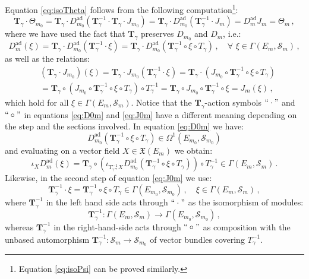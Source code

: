 \documentclass[10pt, cmp, numbook, final, a4paper]{svjour}
\newcommand*{\SavedEqref}{}
\let\SavedEqref\eqref
\renewcommand*{\eqref}[1]{%
  \begingroup
    \hypersetup{
      linkcolor=blue,
      linkbordercolor=blue,
    }%
    \SavedEqref{#1}%
  \endgroup
}
\def\ad{\mathrm{ad}}
\def\ad{\mathrm{ad}}
\def\cS{\mathcal{S}}
\def\mT{\mathbf{T}}
\begin{document}
\begin{remark}
\label{remark:Tgammaction}
Equation \eqref{eq:isoTheta} follows from the following
computation\footnote{Equation \eqref{eq:isoPsi} can be proved
  similarly.}:
\begin{equation*}
\mT_{\gamma} \cdot \Theta_{m_{0}} = \mT_{\gamma}\cdot D^{\ad}_{m_{0}}(\mT^{-1}_{\gamma}\cdot\mT_{\gamma}\cdot J_{m_{0}}) = \mT_{\gamma}\cdot D^{\ad}_{m_{0}}(\mT^{-1}_{\gamma}\cdot J_{m}) = D^{\ad}_{m} J_{m} = \Theta_{m}\, ,
\end{equation*}
where we have used the fact that $\mT_{\gamma}$ preserves $D_{m_{0}}$ and $D_{m}$, i.e.:
\begin{equation}
\label{eq:D0m}
D^{\ad}_{m}(\xi)  =  \mT_{\gamma}\cdot D^{\ad}_{m_{0}} (\mT^{-1}_{\gamma}\cdot\xi) = \mT_{\gamma}\cdot D^{\ad}_{m_{0}} (\mT^{-1}_{\gamma}\circ\xi \circ T_{\gamma})\, , \quad\forall\,\, \xi\in\Gamma(E_{m},\cS_{m})\, ,
\end{equation}
as well as the relations:
\begin{eqnarray}
\label{eq:J0m}
& (\mT_{\gamma}\cdot J_{m_{0}})(\xi) = \mT_{\gamma}\cdot J_{m_{0}}(\mT^{-1}_{\gamma}\cdot\xi) = \mT_{\gamma}\cdot (J_{m_{0}} \circ\mT^{-1}_{\gamma}\circ \xi \circ T_{\gamma}) \nonumber\\
& = \mT_{\gamma}\circ (J_{m_{0}} \circ\mT^{-1}_{\gamma}\circ \xi \circ T_{\gamma})\circ T^{-1}_{\gamma} = \mT_{\gamma}\circ J_{m_{0}} \circ\mT^{-1}_{\gamma}\circ \xi = J_{m}(\xi)\, ,
\end{eqnarray}
which hold for all $\xi\in \Gamma(E_{m},\cS_{m})$. Notice that the
$\mT_{\gamma}$-action symbols $``\cdot"$ and $``\circ"$ in equations
\eqref{eq:D0m} and \eqref{eq:J0m} have a different meaning depending
on the step and the sections involved. In equation \eqref{eq:D0m} we
have:
\begin{equation*}
D^{\ad}_{m_{0}} (\mT^{-1}_{\gamma}\circ\xi \circ T_{\gamma}) \in \Omega^{1}(E_{m_{0}},\cS_{m_{0}})
\end{equation*}
and evaluating on a vector field $X\in\mathfrak{X}(E_{m})$ we obtain:
\begin{equation*}
\iota_{X} D^{\ad}_{m}(\xi) = \mT_{\gamma}\circ \left(\iota_{T^{-1}_{\gamma\ast}X} D^{\ad}_{m_{0}} (\mT^{-1}_{\gamma}\circ\xi \circ T_{\gamma})\right)\circ T^{-1}_{\gamma}\in \Gamma(E_{m},\cS_{m})\, .
\end{equation*}
Likewise, in the second step of equation \eqref{eq:J0m} we use:
\begin{equation*}
\mT^{-1}_{\gamma}\cdot\xi = \mT^{-1}_{\gamma}\circ \xi \circ T_{\gamma}\in \Gamma(E_{m_{0}},\cS_{m_{0}}) \, , \quad \xi\in \Gamma(E_{m},\cS_{m})\, ,
\end{equation*}
where $\mT^{-1}_{\gamma}$ in the left hand side acts through
$``\cdot"$ as the isomorphism of modules:
\begin{equation*}
\mT^{-1}_{\gamma}\colon \Gamma(E_{m},\cS_m) \to \Gamma(E_{m_{0}},\cS_{m_{0}})\, ,
\end{equation*}
whereas $\mT^{-1}_{\gamma}$ in the right-hand-side acts through $``\circ"$
as composition with the unbased automorphism
$\mT^{-1}_{\gamma}\colon \cS_{m}\to \cS_{m_{0}}$ of vector bundles
covering $T^{-1}_{\gamma}$. 
\end{remark}
\end{document}
